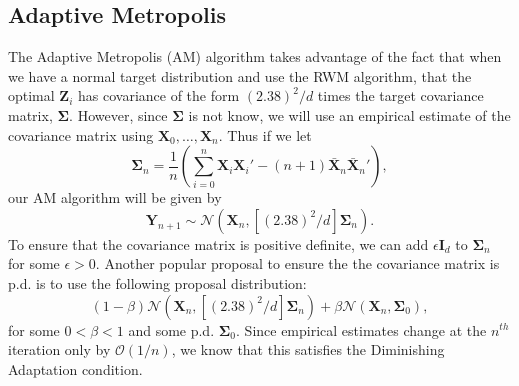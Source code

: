 \documentclass[twoside]{article}
\begin{document}
\subsection{Adaptive Metropolis}
The Adaptive Metropolis (AM) algorithm takes advantage of the fact that when we have a normal target distribution and use the RWM algorithm, that the optimal $\mathbf{Z}_i$ has covariance of the form $(2.38)^2/d$ times the target covariance matrix, $\boldsymbol{\Sigma}$. However, since $\boldsymbol{\Sigma}$ is not know, we will use an empirical estimate of the covariance matrix using $\mathbf{X}_0, \dots, \mathbf{X}_n$. Thus if we let $$\boldsymbol{\Sigma}_n = \frac{1}{n}\left(\sum_{i=0}^n \mathbf{X}_i \mathbf{X}_i' - (n+1)\bar{\mathbf{X}}_n \bar{\mathbf{X}}_n' \right),$$
our AM algorithm will be given by
$$\mathbf{Y}_{n+1} \sim \mathcal{N}(\mathbf{X}_n, [(2.38)^2/d]\boldsymbol{\Sigma}_n).$$
To ensure that the covariance matrix is positive definite, we can add $\epsilon \mathbf{I}_d$ to $\boldsymbol{\Sigma}_n$ for some $\epsilon > 0$. Another popular proposal to ensure the the covariance matrix is p.d. is to use the following proposal distribution:
$$(1-\beta)\mathcal{N}(\mathbf{X}_n, [(2.38)^2/d]\boldsymbol{\Sigma}_n) + \beta \mathcal{N}(\mathbf{X}_n, \boldsymbol{\Sigma}_0),$$
for some $0 <\beta < 1$ and some p.d. $\boldsymbol{\Sigma}_0$. Since empirical estimates change at the $n^{th}$ iteration only by $\mathcal{O}(1/n)$, we know that this satisfies the Diminishing Adaptation condition.
\end{document}
